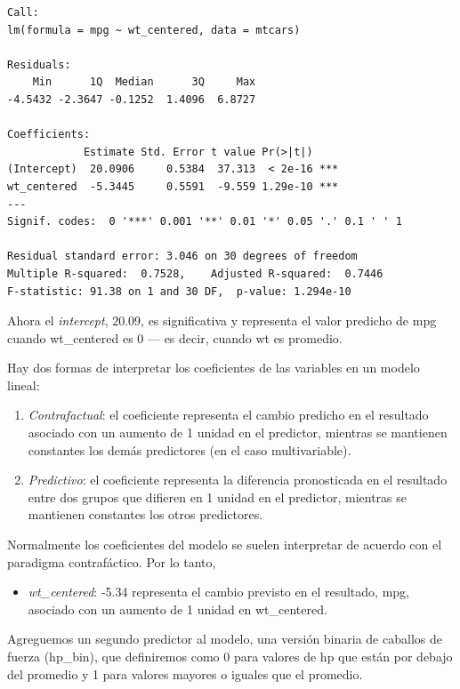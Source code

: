 \documentclass[
]{book}
\providecommand{\tightlist}{%
  \setlength{\itemsep}{0pt}\setlength{\parskip}{0pt}}
\begin{document}
\begin{verbatim}
Call:
lm(formula = mpg ~ wt_centered, data = mtcars)

Residuals:
    Min      1Q  Median      3Q     Max 
-4.5432 -2.3647 -0.1252  1.4096  6.8727 

Coefficients:
            Estimate Std. Error t value Pr(>|t|)    
(Intercept)  20.0906     0.5384  37.313  < 2e-16 ***
wt_centered  -5.3445     0.5591  -9.559 1.29e-10 ***
---
Signif. codes:  0 '***' 0.001 '**' 0.01 '*' 0.05 '.' 0.1 ' ' 1

Residual standard error: 3.046 on 30 degrees of freedom
Multiple R-squared:  0.7528,    Adjusted R-squared:  0.7446 
F-statistic: 91.38 on 1 and 30 DF,  p-value: 1.294e-10
\end{verbatim}

Ahora el \emph{intercept}, 20.09, es significativa y representa el valor predicho de mpg cuando wt\_centered es 0 --- es decir, cuando wt es promedio.

Hay dos formas de interpretar los coeficientes de las variables en un modelo lineal:

\begin{enumerate}
\def\labelenumi{\arabic{enumi}.}
\item
  \emph{Contrafactual}: el coeficiente representa el cambio predicho en el resultado asociado con un aumento de 1 unidad en el predictor, mientras se mantienen constantes los demás predictores (en el caso multivariable).
\item
  \emph{Predictivo}: el coeficiente representa la diferencia pronosticada en el resultado entre dos grupos que difieren en 1 unidad en el predictor, mientras se mantienen constantes los otros predictores.
\end{enumerate}

Normalmente los coeficientes del modelo se suelen interpretar de acuerdo con el paradigma contrafáctico. Por lo tanto,

\begin{itemize}
\tightlist
\item
  \emph{wt\_centered}: -5.34 representa el cambio previsto en el resultado, mpg, asociado con un aumento de 1 unidad en wt\_centered.
\end{itemize}

Agreguemos un segundo predictor al modelo, una versión binaria de caballos de fuerza (hp\_bin), que definiremos como 0 para valores de hp que están por debajo del promedio y 1 para valores mayores o iguales que el promedio.
\end{document}
